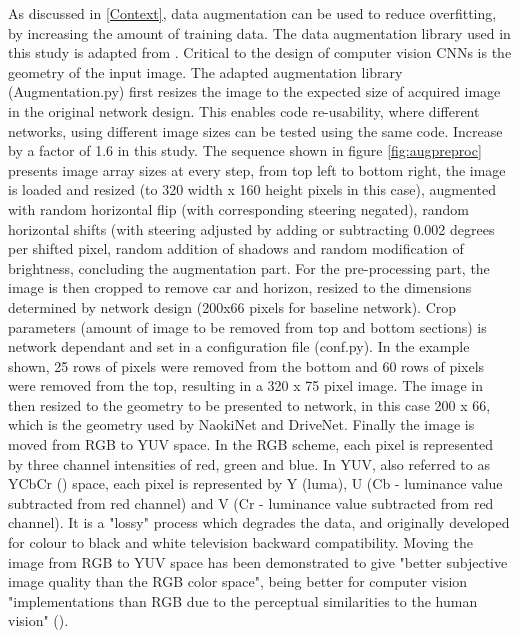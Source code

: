 As discussed in \ref{Context}, data augmentation can be used to reduce overfitting, by increasing the amount of training data. The data augmentation library used in this study is adapted from \cite{Naoki2016}. Critical to the design of computer vision CNNs is the geometry of the input image. The adapted augmentation library (Augmentation.py) first resizes the image to the expected size of acquired image in the original network design. This enables code re-usability, where different networks, using different image sizes can be tested using the same code. 
Increase by a factor of 1.6 in this study.
The sequence shown in figure \ref{fig:augpreproc} presents image array sizes at every step, from top left to bottom right, the image is loaded and resized (to 320 width x 160 height pixels in this case), augmented with random horizontal flip (with corresponding steering negated), random horizontal shifts (with steering adjusted by adding or subtracting 0.002 degrees per shifted pixel, random addition of shadows and random modification of brightness, concluding the augmentation part.
For the pre-processing part, the image is then cropped to remove car and horizon, resized to the dimensions determined by network design (200x66 pixels for baseline network). Crop parameters (amount of image to be removed from top and bottom sections) is network dependant and set in a configuration file (conf.py). In the example shown, 25 rows of pixels were removed from the bottom and 60 rows of pixels were removed from the top, resulting in a 320 x 75 pixel image. The image in then resized to the geometry to be presented to network, in this case 200 x 66, which is the geometry used by NaokiNet and DriveNet. Finally the image is moved from RGB to YUV space. In the RGB scheme, each pixel is represented by three channel intensities of red, green and blue. In YUV, also referred to as YCbCr (\cite{maller2020}) space, each pixel is represented by Y (luma), U (Cb - luminance value subtracted from red channel) and V (Cr - luminance value subtracted from red channel). It is a "lossy" process which degrades the data, and originally developed for colour to black and white television backward compatibility. Moving the image from RGB to YUV space has been demonstrated to give "better subjective image quality than the RGB color space", being better for computer vision "implementations than RGB due to the perceptual similarities to the human vision" (\cite{podpora2014yuv}).

